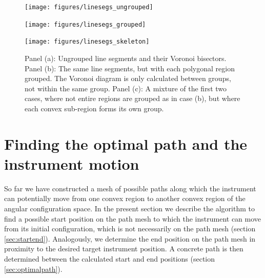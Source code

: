 \begin{figure}
	\begin{minipage}{0.5 \textwidth}
		\begin{center}
			\texttt{[image: figures/linesegs\_ungrouped]}
		\end{center}
	\end{minipage}
	\begin{minipage}{0.5 \textwidth}
		\begin{center}
			\texttt{[image: figures/linesegs\_grouped]}
		\end{center}
	\end{minipage}
	\vspace{0.25cm}

	\begin{minipage}{0.5 \textwidth}
		\begin{center}
			\texttt{[image: figures/linesegs\_skeleton]}
		\end{center}
	\end{minipage}
	\caption[Voronoi diagrams for polygonal regions.]{
		Panel (a): Ungrouped line segments and their Voronoi bisectors.
		Panel (b): The same line segments, but with each polygonal region grouped.
		The Voronoi diagram is only calculated between groups, not within the same group.
		Panel (c): A mixture of the first two cases, where not entire regions are grouped
		as in case (b), but where each convex sub-region forms its own group.
		\label{fig:linesegs_grouped_voro}}
\end{figure}






\section{Finding the optimal path and the instrument motion}
\label{sec:exepath}

So far we have constructed a mesh of possible paths along which the instrument can 
potentially move from one convex region to another convex region of the angular configuration space.
In the present section we describe the algorithm to find a possible start position on the
path mesh to which the instrument can move from its initial configuration, which is
not necessarily on the path mesh (section \ref{sec:startend}).
Analogously, we determine the end position on the path mesh in proximity to the 
desired target instrument position.
A concrete path is then determined between the calculated start and end positions
(section \ref{sec:optimalpath}).


